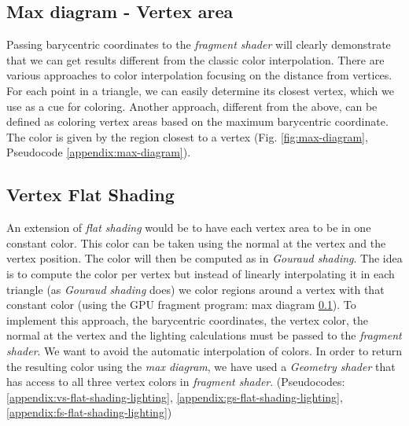 
\subsection{Max diagram - Vertex area} \label{section:max-diagram}
Passing barycentric coordinates to the \textit{fragment shader} will clearly demonstrate that we can get results different from the classic color interpolation.\cite{WEBSITE:redbloggames}
There are various approaches to color interpolation focusing on the distance from vertices. For each point in a triangle, we can easily determine its closest vertex, which we use as a cue for coloring.
Another approach, different from the above, can be defined as coloring vertex areas based on the maximum barycentric coordinate.
The color is given by the region closest to a vertex (Fig. \ref{fig:max-diagram}, Pseudocode \ref{appendix:max-diagram}).


\subsection{Vertex Flat Shading} \label{section:extend-flat-shading-lighting}
An extension of \textit{flat shading} would be to have each vertex area to be in one constant color. This color can be taken using the normal at the vertex and the vertex position.
The color will then be computed as in \textit{Gouraud shading}.
The idea is to compute the color per vertex but instead of linearly interpolating it in each triangle (as \textit{Gouraud shading} does) we color regions around a vertex with that constant color (using the GPU fragment program: max diagram \ref{section:max-diagram}).
To implement this approach, the barycentric coordinates, the vertex color, the normal at the vertex and the lighting calculations must be passed to the \textit{fragment shader}.
We want to avoid the automatic interpolation of colors. In order to return the resulting color using the \textit{max diagram}, we have used a \textit{Geometry shader} that has access to all three vertex colors in \textit{fragment shader}. (Pseudocodes: \ref{appendix:vs-flat-shading-lighting}, \ref{appendix:gs-flat-shading-lighting}, \ref{appendix:fs-flat-shading-lighting})

